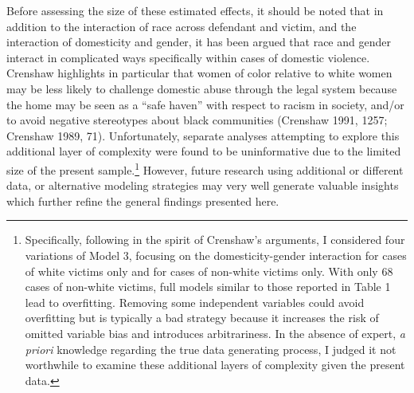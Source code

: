 \documentclass[12pt,article]{article}
\begin{document}
Before assessing the size of these estimated effects, it should be noted
that in addition to the interaction of race across defendant and victim,
and the interaction of domesticity and gender, it has been argued that
race and gender interact in complicated ways specifically within cases
of domestic violence. Crenshaw highlights in particular that women of
color relative to white women may be less likely to challenge domestic
abuse through the legal system because the home may be seen as a ``safe
haven'' with respect to racism in society, and/or to avoid negative
stereotypes about black communities (Crenshaw 1991, 1257; Crenshaw 1989,
71). Unfortunately, separate analyses attempting to explore this
additional layer of complexity were found to be uninformative due to the
limited size of the present sample.\footnote{Specifically, following in
  the spirit of Crenshaw's arguments, I considered four variations of
  Model 3, focusing on the domesticity-gender interaction for cases of
  white victims only and for cases of non-white victims only. With only
  68 cases of non-white victims, full models similar to those reported
  in Table 1 lead to overfitting. Removing some independent variables
  could avoid overfitting but is typically a bad strategy because it
  increases the risk of omitted variable bias and introduces
  arbitrariness. In the absence of expert, \emph{a priori} knowledge
  regarding the true data generating process, I judged it not worthwhile
  to examine these additional layers of complexity given the present
  data.} However, future research using additional or different data, or
alternative modeling strategies may very well generate valuable insights
which further refine the general findings presented here.

\pagebreak
\end{document}
